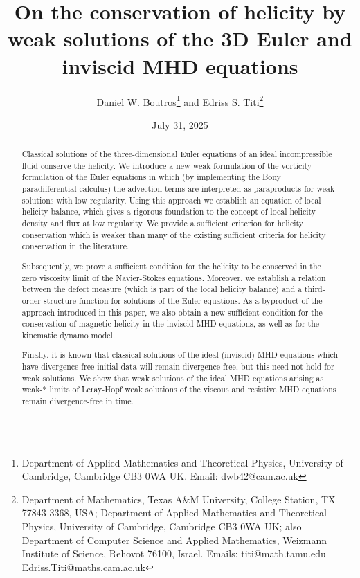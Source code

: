 \documentclass[12pt,a4paper]{article}
\theoremstyle{definition}
\theoremstyle{remark}
\numberwithin{equation}{section}
\begin{document}
	
	\title{On the conservation of helicity by weak solutions of the 3D Euler and inviscid MHD equations}
	
	
	
	\author[]{Daniel W. Boutros\footnote{Department of Applied Mathematics and Theoretical Physics, University of Cambridge, Cambridge CB3 0WA UK. Email: \textsf{dwb42@cam.ac.uk}} \space and Edriss S. Titi\footnote{Department of Mathematics, Texas A\&M University, College Station, TX 77843-3368, USA; Department of Applied Mathematics and Theoretical Physics, University of Cambridge, Cambridge CB3 0WA UK; also Department of Computer Science and Applied Mathematics, Weizmann Institute of Science, Rehovot 76100, Israel. Emails: \textsf{titi@math.tamu.edu} \; \textsf{Edriss.Titi@maths.cam.ac.uk}}}
	
	
	\date{July 31, 2025} 
	
	\maketitle
	
\begin{abstract}
Classical solutions of the three-dimensional Euler equations of an ideal incompressible fluid conserve the helicity. We introduce a new weak formulation of the vorticity formulation of the Euler equations in which (by implementing the Bony paradifferential calculus) the advection terms are interpreted as paraproducts for weak solutions with low regularity. Using this approach we establish an equation of local helicity balance, which gives a rigorous foundation to the concept of local helicity density and flux at low regularity. We provide a sufficient criterion for helicity conservation which is weaker than many of the existing sufficient criteria for helicity conservation in the literature.

Subsequently, we prove a sufficient condition for the helicity to be conserved in the zero viscosity limit of the Navier-Stokes equations. Moreover, we establish a relation between the defect measure (which is part of the local helicity balance) and a third-order structure function for solutions of the Euler equations. As a byproduct of the approach introduced in this paper, we also obtain a new sufficient condition for the conservation of magnetic helicity in the inviscid MHD equations, as well as for the kinematic dynamo model. 

Finally, it is known that classical solutions of the ideal (inviscid) MHD equations which have divergence-free initial data will remain divergence-free, but this need not hold for weak solutions. We show that weak solutions of the ideal MHD equations arising as weak-$*$ limits of Leray-Hopf weak solutions of the viscous and resistive MHD equations remain divergence-free in time. 
\end{abstract}
\end{document}
